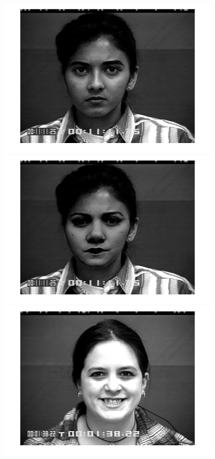 \begin{figure}[!htb]
    	\includegraphics[scale=.10]{figure/79/03.png}
    	\includegraphics[scale=.10]{figure/79de/03.png}
    	\hspace{1cm}
    	\includegraphics[scale=.10]{figure/72/14.png}

\end{figure}
